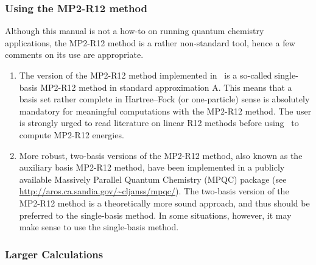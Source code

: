 \subsubsection{Using the MP2-R12 method}
Although this manual is not a how-to on running
quantum chemistry applications, the MP2-R12 method is
a rather non-standard tool, hence a few comments on its
use are appropriate.

\begin{enumerate}
\item
The version of the MP2-R12 method implemented in \PSIthree\
is a so-called single-basis MP2-R12 method
in standard approximation A. This means that a basis set
rather complete in Hartree--Fock (or one-particle) sense
is absolutely mandatory for meaningful computations with the MP2-R12
method. The user is strongly urged to read literature on
linear R12 methods before using \PSIthree\ to compute MP2-R12
energies.
\item
More robust, two-basis versions
of the MP2-R12 method, also known as the auxiliary basis
MP2-R12 method, have been implemented
in a publicly available Massively Parallel Quantum Chemistry (MPQC)
package (see \url{http://aros.ca.sandia.gov/~cljanss/mpqc/}).
The two-basis version of the MP2-R12 method is a theoretically more
sound approach, and thus should be preferred to the single-basis method.
In some situations, however, it may make sense to use
the single-basis method.
\end{enumerate}

\subsubsection{Larger Calculations}

